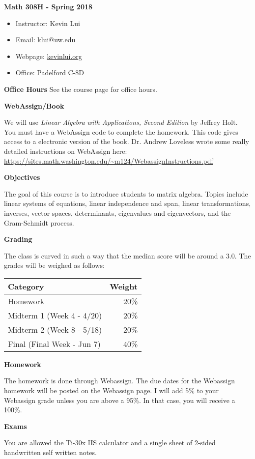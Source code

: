 \documentclass{article}
\begin{document}
\textbf{\huge  Math 308H - Spring 2018}
\begin{itemize}
    \item
        Instructor: Kevin Lui
    \item
        Email: \href{mailto:klui@uw.edu}{klui@uw.edu}
    \item
        Webpage: \url{kevinlui.org}
    \item
        Office: Padelford C-8D
\end{itemize}

\textbf{Office Hours}
See the course page for office hours.

\textbf{WebAssign/Book}

We will use \textit{Linear Algebra with Applications, Second Edition} by
Jeffrey Holt. You must have a WebAssign code to complete the homework. This
code gives access to a electronic version of the book. Dr. Andrew Loveless
wrote some really detailed instructions on WebAssign here:
\url{https://sites.math.washington.edu/~m124/WebassignInstructions.pdf}

\textbf{Objectives}

The goal of this course is to introduce students to matrix algebra. Topics
include linear systems of equations, linear independence and span, linear
transformations, inverses, vector spaces, determinants, eigenvalues and
eigenvectors, and the Gram-Schmidt process.

\textbf{Grading}

The class is curved in such a way that the median score will be around a 3.0.
The grades will be weighed as follows:

\begin{tabular}{ l r }
    Category  & Weight   \\
    \hline
    Homework  & 20\%      \\
    Midterm 1 (Week 4 - 4/20) & 20\%      \\
    Midterm 2 (Week 8 - 5/18) & 20\%      \\
    Final (Final Week - Jun 7)    & 40\%
\end{tabular}

\textbf{Homework}

The homework is done through Webassign. The due dates for the Webassign
homework will be posted on the Webassign page. I will add 5\% to your
Webassign grade unless you are above a 95\%. In that case, you will receive a
100\%.

\textbf{Exams}

You are allowed the Ti-30x IIS calculator and a single sheet of 2-sided
handwritten self written notes.
\end{document}
